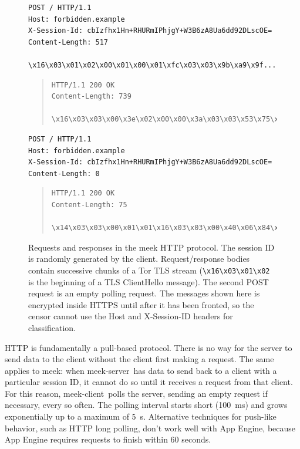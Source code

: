 \documentclass[conference]{IEEEtran}
\def\meekclient{\mbox{meek-client}}
\def\meekserver{\mbox{meek-server}}
\begin{document}
\begin{figure}
\scriptsize
\begin{verbatim}
POST / HTTP/1.1
Host: forbidden.example
X-Session-Id: cbIzfhx1Hn+RHURmIPhjgY+W3B6zA8Ua6dd92DLscOE=
Content-Length: 517

\x16\x03\x01\x02\x00\x01\x00\x01\xfc\x03\x03\x9b\xa9\x9f...
\end{verbatim}
\smallskip
\begin{quote}
\begin{verbatim}
HTTP/1.1 200 OK
Content-Length: 739

\x16\x03\x03\x00\x3e\x02\x00\x00\x3a\x03\x03\x53\x75\xa2...
\end{verbatim}
\end{quote}
\smallskip
\begin{verbatim}
POST / HTTP/1.1
Host: forbidden.example
X-Session-Id: cbIzfhx1Hn+RHURmIPhjgY+W3B6zA8Ua6dd92DLscOE=
Content-Length: 0

\end{verbatim}
\smallskip
\begin{quote}
\begin{verbatim}
HTTP/1.1 200 OK
Content-Length: 75

\x14\x03\x03\x00\x01\x01\x16\x03\x03\x00\x40\x06\x84\x25...
\end{verbatim}
\end{quote}
\caption{
Requests and responses in the meek HTTP protocol.
The session ID is randomly generated by the client.
Request/response bodies contain successive chunks of a Tor TLS stream
(\texttt{\textbackslash{}x16\textbackslash{}x03\textbackslash{}x01\textbackslash{}x02}
is the beginning of a TLS ClientHello message).
The second POST request is an empty polling request.
The messages shown here is encrypted inside HTTPS until after
it has been fronted,
so the censor cannot use the
Host and X-Session-ID headers for classification.
}
\label{fig:protocol}
\end{figure}


HTTP is fundamentally a pull-based protocol.
There is no way for the server to send data to the client without
the client first making a request.
The same applies to meek: when \meekserver\ has data to send back to
a client with a particular session ID, it cannot do so until it
receives a request from that client.
For this reason, \meekclient\ polls the server,
sending an empty request if necessary, every so often.
The polling interval starts short (100~ms) and grows exponentially
up to a maximum of 5~s.
Alternative techniques for push-like behavior,
such as HTTP long polling,
don't work well with App Engine,
because App Engine requires requests to finish within 60 seconds.
\end{document}
